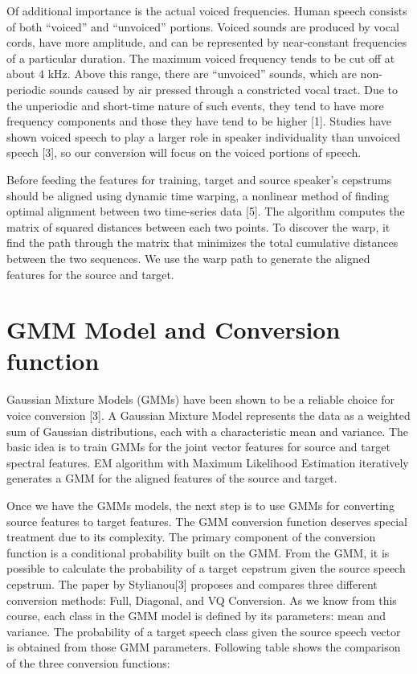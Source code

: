 \documentclass{article}
\begin{document}
Of additional importance is the actual voiced frequencies. Human speech consists of both ``voiced'' and ``unvoiced'' portions. Voiced sounds are produced by vocal cords, have more amplitude, and can be represented by near-constant frequencies of a particular duration. The maximum voiced frequency tends to be cut off at about 4 kHz. Above this range, there are ``unvoiced'' sounds, which are non-periodic sounds caused by air pressed through a constricted vocal tract. Due to the unperiodic and short-time nature of such events, they tend to have more frequency components and those they have tend to be higher [1]. Studies have shown voiced speech to play a larger role in speaker individuality than unvoiced speech [3], so our conversion will focus on the voiced portions of speech.

Before feeding the features for training, target and source speaker's cepstrums should be aligned using dynamic time warping, a nonlinear method of finding optimal alignment between two time-series data [5]. The algorithm computes the matrix of squared distances between each two points. To discover the warp, it find the path through the matrix that minimizes the total cumulative distances between the two sequences. We use the warp path to generate the aligned features for the source and target.

\section{GMM Model and Conversion function}
Gaussian Mixture Models (GMMs) have been shown to be a reliable choice for voice conversion [3]. A Gaussian Mixture Model represents the data as a weighted sum of Gaussian distributions, each with a characteristic mean and variance. The basic idea is to train GMMs for the joint vector features for source and target spectral features. EM algorithm with Maximum Likelihood Estimation iteratively generates a GMM for the aligned features of the source and target. 

Once we have the GMMs models, the next step is to use GMMs for converting source features to target features. The GMM conversion function deserves special treatment due to its complexity. The primary component of the conversion function is a conditional probability built on the GMM. From the GMM, it is possible to calculate the probability of a target cepstrum given the source speech cepstrum. The paper by Stylianou[3] proposes and compares three different conversion methods: Full, Diagonal, and VQ Conversion. As we know from this course, each class in the GMM model is defined by its parameters: mean and variance. The probability of a target speech class given the source speech vector is obtained from those GMM parameters. Following table shows the comparison of the three conversion functions:
\end{document}
